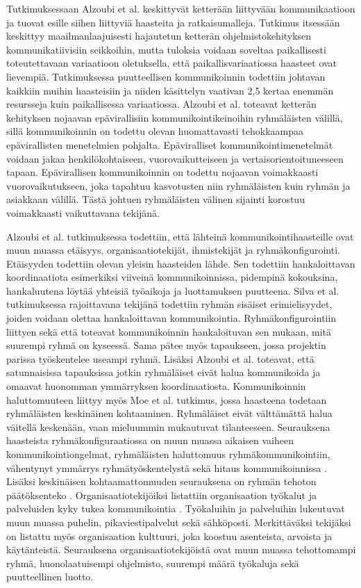 Tutkimuksessaan Alzoubi et al. \cite{ALZOUBI201622} keskittyvät ketterään liittyvään kommunikaatioon ja tuovat esille siihen liittyviä haasteita ja ratkaisumalleja. Tutkimus itsessään keskittyy maailmanlaajuisesti hajautetun ketterän ohjelmistokehityksen kommunikatiivisiin seikkoihin, mutta tuloksia voidaan soveltaa paikallisesti toteutettavaan variaatioon oletuksella, että paikallisvariaatiossa haasteet ovat lievempiä. Tutkimuksessa puutteellisen kommunikoinnin todettiin johtavan kaikkiin muihin haasteisiin ja niiden käsittelyn vaativan 2,5 kertaa enemmän resursseja kuin paikallisessa variaatiossa. Alzoubi et al. toteavat ketterän kehityksen nojaavan epävirallisiin kommunikointikeinoihin ryhmäläisten välillä, sillä kommunikoinnin on todettu olevan huomattavasti tehokkaampaa epävirallisten menetelmien pohjalta. Epäviralliset kommunikointimenetelmät voidaan jakaa henkilökohtaiseen, vuorovaikutteiseen ja vertaisorientoituneeseen tapaan. Epävirallisen kommunikoinnin on todettu nojaavan voimakkaasti vuorovaikutukseen, joka tapahtuu kasvotusten niin ryhmäläisten kuin ryhmän ja asiakkaan välillä. Tästä johtuen ryhmäläisten välinen sijainti korostuu voimakkaasti vaikuttavana tekijänä.

Alzoubi et al. tutkimuksessa \cite{ALZOUBI201622} todettiin, että lähteinä kommunikointihaasteille ovat muun muassa etäisyys, organisaatiotekijät, ihmistekijät ja ryhmäkonfigurointi. Etäisyyden todettiin olevan yleisin haasteiden lähde. Sen todettiin hankaloittavan koordinaatiota esimerkiksi viiveinä kommunikoinnissa, pidempinä kokouksina, hankaluutena löytää yhteisiä työaikoja ja luottamuksen puutteena. Silva et al. tutkimuksessa \cite{SELLERISILVA201520} rajoittavana tekijänä todettiin ryhmän sisäiset erimielisyydet, joiden voidaan olettaa hankaloittavan kommunikointia. Ryhmäkonfigurointiin liittyen sekä \cite{SELLERISILVA201520} että \cite{ALZOUBI201622} toteavat kommunikoinnin hankaloituvan sen mukaan, mitä suurempi ryhmä on kyseessä. Sama pätee myös tapaukseen, jossa projektin parissa työskentelee useampi ryhmä. Lisäksi Alzoubi et al. \cite{ALZOUBI201622} toteavat, että satunnaisissa tapauksissa jotkin ryhmäläiset eivät halua kommunikoida ja omaavat huonomman ymmärryksen koordinaatiosta. Kommunikoinnin haluttomuuteen liittyy myös Moe et al. \cite{MOE2012853} tutkimus, jossa haasteena todetaan ryhmäläisten keskinäinen kohtaaminen. Ryhmäläiset eivät välttämättä halua väitellä keskenään, vaan mieluummin mukautuvat tilanteeseen. Seurauksena haasteista ryhmäkonfiguraatiossa on muun muassa aikaisen vaiheen kommunikointiongelmat, ryhmäläisten haluttomuus ryhmäkommunikointiin, vähentynyt ymmärrys ryhmätyöskentelystä sekä hitaus kommunikoinnissa \cite{ALZOUBI201622}. Lisäksi keskinäisen kohtaamattomuuden seurauksena on ryhmän tehoton päätöksenteko \cite{MOE2012853}. Organisaatiotekijöiksi listattiin organisaation työkalut ja palveluiden kyky tukea kommunikointia \cite{ALZOUBI201622}. Työkaluihin ja palveluihin lukeutuvat muun muassa puhelin, pikaviestipalvelut sekä sähköposti. Merkittäväksi tekijäksi on listattu myös organisaation kulttuuri, joka koostuu asenteista, arvoista ja käytänteistä. Seurauksena organisaatiotekijöistä ovat muun muassa tehottomampi ryhmä, huonolaatuisempi ohjelmisto, suurempi määrä työkaluja sekä puutteellinen luotto.


